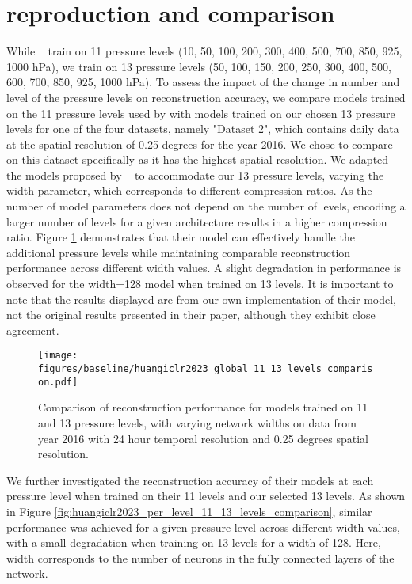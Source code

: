 \documentclass[11pt, a4paper, logo, copyright, numbering]{googledeepmind}
\begin{document}
\section{\cite{huang2022compressing} reproduction and comparison}
\label{sx:appendix:huangiclr2023}
While ~\cite{huang2022compressing} train on 11 pressure levels (10, 50, 100, 200, 300, 400, 500, 700, 850, 925, 1000 hPa), we train on 13 pressure levels (50, 100, 150, 200, 250, 300, 400, 500, 600, 700, 850, 925, 1000 hPa).
To assess the impact of the change in number and level of the pressure levels on reconstruction accuracy, we compare models trained on the 11 pressure  levels used by \cite{huang2022compressing} with models trained on our chosen 13 pressure levels for one of the four datasets, namely "Dataset 2", which contains daily data at the spatial resolution of 0.25 degrees for the year 2016.
We chose to compare on this dataset specifically as it has the highest spatial resolution.
We adapted the models proposed by 
~\cite{huang2022compressing} to accommodate our 13 pressure levels, varying the width parameter, which corresponds to different compression ratios.
As the number of model parameters does not depend on the number of levels, encoding a larger number of levels for a given architecture results in a higher compression ratio. 
Figure \ref{fig:huangiclr2023_global_11_13_levels_comparison} demonstrates that their model can effectively handle the additional pressure levels while maintaining comparable reconstruction performance across different width values. A slight degradation in performance is observed for the width=128 model when trained on 13 levels. It is important to note that the results displayed are from our own implementation of their model, not the original results presented in their paper, although they exhibit close agreement.

\begin{figure}[h]
\centering
\texttt{[image: figures/baseline/huangiclr2023\_global\_11\_13\_levels\_comparison.pdf]}
\caption{Comparison of reconstruction performance for models trained on 11 and 13 pressure levels, with varying network widths on data from year 2016 with 24 hour temporal resolution and 0.25 degrees spatial resolution.}
\label{fig:huangiclr2023_global_11_13_levels_comparison}
\end{figure}

We further investigated the reconstruction accuracy of their models at each pressure level when trained on their 11 levels and our selected 13 levels. As shown in Figure \ref{fig:huangiclr2023_per_level_11_13_levels_comparison}, similar performance was achieved for a given pressure level across different width values, with a small degradation when training on 13 levels for a width of 128. Here, width corresponds to the number of neurons in the fully connected layers of the network.
\end{document}
